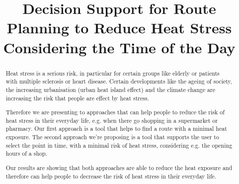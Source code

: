 \documentclass[a4paper]{scrartcl}
\title{Decision Support for Route Planning to Reduce Heat Stress Considering the Time of the Day}
\author{}
\begin{document}
\maketitle

\begin{abstract}
	Heat stress is a serious risk, in particular for certain groups like elderly or patients with multiple sclerosis or heart disease. Certain developments like the ageing of society, the increasing urbanisation (urban heat island effect) and the climate change are increasing the risk that people are effect by heat stress. 
	
	Therefore we are presenting to approaches that can help people to reduce the risk of heat stress in their everyday life, e.g. when there go shopping in a supermarket or pharmacy. Our first approach is a tool that helps to find a route with a minimal heat exposure. The second approach we're proposing is a tool that supports the user to select the point in time, with a minimal risk of heat stress, considering e.g. the opening hours of a shop.
	
	Our results are showing that both approaches are able to reduce the heat exposure and therefore can help people to decrease the risk of heat stress in their everyday life.
\end{abstract}
\end{document}
